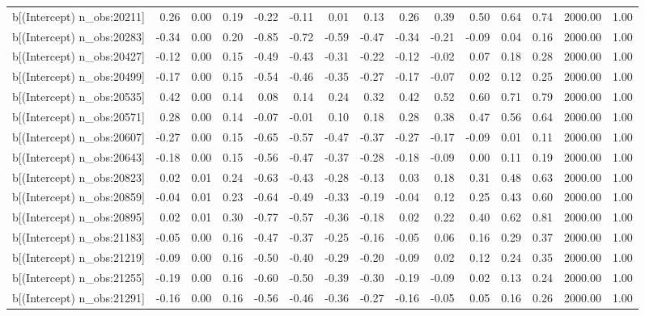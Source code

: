 \begin{table}[ht]
\begin{tabular}{rrrrrrrrrrrrrrr}
  b[(Intercept) n\_obs:20211] & 0.26 & 0.00 & 0.19 & -0.22 & -0.11 & 0.01 & 0.13 & 0.26 & 0.39 & 0.50 & 0.64 & 0.74 & 2000.00 & 1.00 \\ 
  b[(Intercept) n\_obs:20283] & -0.34 & 0.00 & 0.20 & -0.85 & -0.72 & -0.59 & -0.47 & -0.34 & -0.21 & -0.09 & 0.04 & 0.16 & 2000.00 & 1.00 \\ 
  b[(Intercept) n\_obs:20427] & -0.12 & 0.00 & 0.15 & -0.49 & -0.43 & -0.31 & -0.22 & -0.12 & -0.02 & 0.07 & 0.18 & 0.28 & 2000.00 & 1.00 \\ 
  b[(Intercept) n\_obs:20499] & -0.17 & 0.00 & 0.15 & -0.54 & -0.46 & -0.35 & -0.27 & -0.17 & -0.07 & 0.02 & 0.12 & 0.25 & 2000.00 & 1.00 \\ 
  b[(Intercept) n\_obs:20535] & 0.42 & 0.00 & 0.14 & 0.08 & 0.14 & 0.24 & 0.32 & 0.42 & 0.52 & 0.60 & 0.71 & 0.79 & 2000.00 & 1.00 \\ 
  b[(Intercept) n\_obs:20571] & 0.28 & 0.00 & 0.14 & -0.07 & -0.01 & 0.10 & 0.18 & 0.28 & 0.38 & 0.47 & 0.56 & 0.64 & 2000.00 & 1.00 \\ 
  b[(Intercept) n\_obs:20607] & -0.27 & 0.00 & 0.15 & -0.65 & -0.57 & -0.47 & -0.37 & -0.27 & -0.17 & -0.09 & 0.01 & 0.11 & 2000.00 & 1.00 \\ 
  b[(Intercept) n\_obs:20643] & -0.18 & 0.00 & 0.15 & -0.56 & -0.47 & -0.37 & -0.28 & -0.18 & -0.09 & 0.00 & 0.11 & 0.19 & 2000.00 & 1.00 \\ 
  b[(Intercept) n\_obs:20823] & 0.02 & 0.01 & 0.24 & -0.63 & -0.43 & -0.28 & -0.13 & 0.03 & 0.18 & 0.31 & 0.48 & 0.63 & 2000.00 & 1.00 \\ 
  b[(Intercept) n\_obs:20859] & -0.04 & 0.01 & 0.23 & -0.64 & -0.49 & -0.33 & -0.19 & -0.04 & 0.12 & 0.25 & 0.43 & 0.60 & 2000.00 & 1.00 \\ 
  b[(Intercept) n\_obs:20895] & 0.02 & 0.01 & 0.30 & -0.77 & -0.57 & -0.36 & -0.18 & 0.02 & 0.22 & 0.40 & 0.62 & 0.81 & 2000.00 & 1.00 \\ 
  b[(Intercept) n\_obs:21183] & -0.05 & 0.00 & 0.16 & -0.47 & -0.37 & -0.25 & -0.16 & -0.05 & 0.06 & 0.16 & 0.29 & 0.37 & 2000.00 & 1.00 \\ 
  b[(Intercept) n\_obs:21219] & -0.09 & 0.00 & 0.16 & -0.50 & -0.40 & -0.29 & -0.20 & -0.09 & 0.02 & 0.12 & 0.24 & 0.35 & 2000.00 & 1.00 \\ 
  b[(Intercept) n\_obs:21255] & -0.19 & 0.00 & 0.16 & -0.60 & -0.50 & -0.39 & -0.30 & -0.19 & -0.09 & 0.02 & 0.13 & 0.24 & 2000.00 & 1.00 \\ 
  b[(Intercept) n\_obs:21291] & -0.16 & 0.00 & 0.16 & -0.56 & -0.46 & -0.36 & -0.27 & -0.16 & -0.05 & 0.05 & 0.16 & 0.26 & 2000.00 & 1.00 \\ 

\end{tabular}
\end{table}
